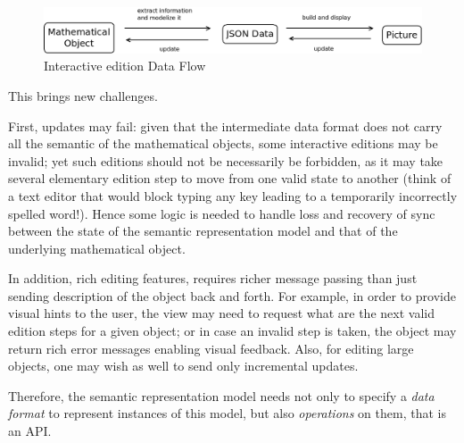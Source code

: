 \documentclass{deliverablereport}
\begin{document}
\begin{figure}[h]
  \begin{center}
    \includegraphics[width=\textwidth]{schemas/DoubleSens}
  \end{center}
  \caption{Interactive edition Data Flow}
  \label{fig:dataflow2}
\end{figure}

This brings new challenges.
%

First, updates may fail: given that the intermediate data format does not
carry all the semantic of the mathematical objects, some interactive
editions may be invalid; yet such editions should not be necessarily
be forbidden, as it may take several elementary edition step to move
from one valid state to another (think of a text editor that would
block typing any key leading to a temporarily incorrectly spelled word!). Hence
some logic is needed to handle loss and recovery of sync between the
state of the semantic representation model and that of the
underlying mathematical object.

In addition, rich editing features, requires richer message passing
than just sending description of the object back and forth. For
example, in order to provide visual hints to the user, the view may
need to request what are the next valid edition steps for a given
object; or in case an invalid step is taken, the object may return
rich error messages enabling visual feedback. Also, for editing large
objects, one may wish as well to send only incremental updates.

Therefore, the semantic representation model needs not only to specify
a \emph{data format} to represent instances of this model, but also
\emph{operations} on them, that is an API.
\end{document}
